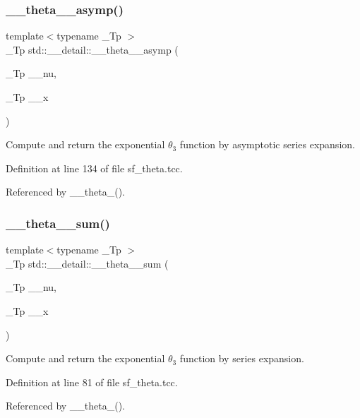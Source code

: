 \subsubsection{\texorpdfstring{\+\_\+\+\_\+theta\+\_\+\_\+asymp()}{\_\_theta\_3\_asymp()}}
{\footnotesize\ttfamily template$<$typename \+\_\+\+Tp $>$ \\
\+\_\+\+Tp std\+::\+\_\+\+\_\+detail\+::\+\_\+\+\_\+theta\+\_\+\_\+asymp (\begin{DoxyParamCaption}\item[{\+\_\+\+Tp}]{\+\_\+\+\_\+nu,  }\item[{\+\_\+\+Tp}]{\+\_\+\+\_\+x }\end{DoxyParamCaption})}

Compute and return the exponential $ \theta_3 $ function by asymptotic series expansion. 

Definition at line 134 of file sf\+\_\+theta.\+tcc.



Referenced by \+\_\+\+\_\+theta\+\_().

\mbox{\label{namespacestd_1_1____detail_a3dc1b5188464b81b6acbb2983ef0f77c}} 
\subsubsection{\texorpdfstring{\+\_\+\+\_\+theta\+\_\+\_\+sum()}{\_\_theta\_3\_sum()}}
{\footnotesize\ttfamily template$<$typename \+\_\+\+Tp $>$ \\
\+\_\+\+Tp std\+::\+\_\+\+\_\+detail\+::\+\_\+\+\_\+theta\+\_\+\_\+sum (\begin{DoxyParamCaption}\item[{\+\_\+\+Tp}]{\+\_\+\+\_\+nu,  }\item[{\+\_\+\+Tp}]{\+\_\+\+\_\+x }\end{DoxyParamCaption})}

Compute and return the exponential $ \theta_3 $ function by series expansion. 

Definition at line 81 of file sf\+\_\+theta.\+tcc.



Referenced by \+\_\+\+\_\+theta\+\_().


